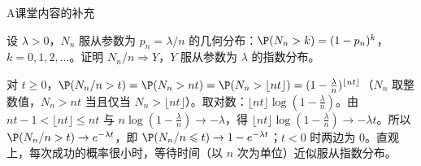 \begin{exercises}{A}{课堂内容的补充}
\item\label{ex:convergence:A7} 设 $\lambda>0$，$N_n$ 服从参数为 $p_n=\lambda/n$ 的几何分布：$\P(N_n>k)=(1-p_n)^k$，$k=0,1,2,\dots$。证明 $N_n/n\Rightarrow Y$，$Y$ 服从参数为 $\lambda$ 的指数分布。
\begin{solution}
对 $t\geqslant0$，$\P(N_n/n>t)=\P(N_n>nt)=\P(N_n>\lfloor nt\rfloor)=(1-\frac\lambda n)^{\lfloor nt\rfloor}$（$N_n$ 取整数值，$N_n>nt$ 当且仅当 $N_n>\lfloor nt\rfloor$）。取对数：$\lfloor nt\rfloor\log(1-\frac\lambda n)$。由 $nt-1<\lfloor nt\rfloor\leqslant nt$ 与 $n\log(1-\frac\lambda n)\to-\lambda$，得 $\lfloor nt\rfloor\log(1-\frac\lambda n)\to-\lambda t$。所以 $\P(N_n/n>t)\to e^{-\lambda t}$，即 $\P(N_n/n\leqslant t)\to1-e^{-\lambda t}$；$t<0$ 时两边为 $0$。直观上，每次成功的概率很小时，等待时间（以 $n$ 次为单位）近似服从指数分布。
\end{solution}
\end{exercises}

